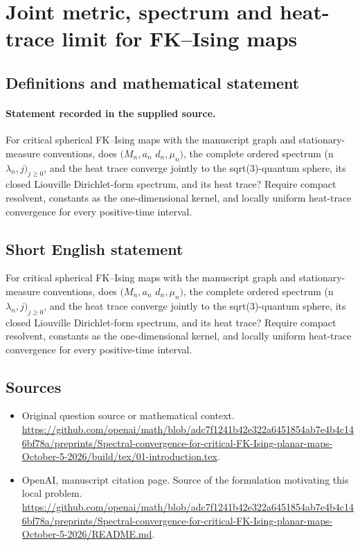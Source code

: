 \documentclass[11pt]{article}
\begin{document}
\section*{Joint metric, spectrum and heat-trace limit for FK–Ising maps}\label{statement}
\subsection{Definitions and mathematical statement}
\paragraph{Statement recorded in the supplied source.}
For critical spherical FK–Ising maps with the manuscript graph and stationary-measure conventions, does $(M_n,a_n$ $d_n,\mu _n)$, the complete ordered spectrum (n $\lambda _n,j)_{j\geq 0}$, and the heat trace converge jointly to the sqrt(3)-quantum sphere, its closed Liouville Dirichlet-form spectrum, and its heat trace? Require compact resolvent, constants as the one-dimensional kernel, and locally uniform heat-trace convergence for every positive-time interval.
\subsection{Short English statement}
For critical spherical FK–Ising maps with the manuscript graph and stationary-measure conventions, does $(M_n,a_n$ $d_n,\mu _n)$, the complete ordered spectrum (n $\lambda _n,j)_{j\geq 0}$, and the heat trace converge jointly to the sqrt(3)-quantum sphere, its closed Liouville Dirichlet-form spectrum, and its heat trace? Require compact resolvent, constants as the one-dimensional kernel, and locally uniform heat-trace convergence for every positive-time interval.
\subsection{Sources}
\begin{itemize}
\item[S1] Original question source or mathematical context.
\url{https://github.com/openai/math/blob/adc7f1241b42e322a6451854ab7e4b4c146bf78a/preprints/Spectral-convergence-for-critical-FK-Ising-planar-maps-October-5-2026/build/tex/01-introduction.tex}.
\item[S2] OpenAI, manuscript citation page. Source of the formulation motivating this local problem.
\url{https://github.com/openai/math/blob/adc7f1241b42e322a6451854ab7e4b4c146bf78a/preprints/Spectral-convergence-for-critical-FK-Ising-planar-maps-October-5-2026/README.md}.
\end{itemize}
\end{document}

